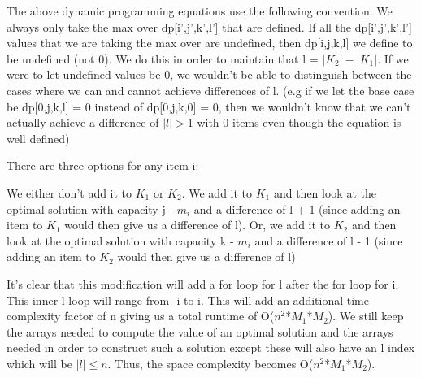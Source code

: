 \documentclass[11pt,a4paper]{article}
\begin{document}
The above dynamic programming equations use the following convention: We always only take the max over dp[i',j',k',l'] that are defined. If all the dp[i',j',k',l'] values that we are taking the max over are undefined, then dp[i,j,k,l] we define to be undefined (not 0). We do this in order to maintain that l = $|K_{2}| - |K_{1}|$. If we were to let undefined values be 0, we wouldn't be able to distinguish between the cases where we can and cannot achieve differences of l. (e.g if we let the base case be dp[0,j,k,l] = 0 instead of dp[0,j,k,0] = 0, then we wouldn't know that we can't actually achieve a difference of $|l| > 1$ with 0 items even though the equation is well defined)

There are three options for any item i:

We either don't add it to $K_{1}$ or $K_{2}$. We add it to $K_{1}$ and then look at the optimal solution with capacity j - $m_{i}$ and a difference of l + 1 (since adding an item to $K_{1}$ would then give us a difference of l). Or, we add it to $K_{2}$ and then look at the optimal solution with capacity k - $m_{i}$ and a difference of l - 1 (since adding an item to $K_{2}$ would then give us a difference of l)

It's clear that this modification will add a for loop for l after the for loop for i. This inner l loop will range from -i to i. This will add an additional time complexity factor of n giving us a total runtime of O($n^{2}$*$M_{1}$*$M_{2}$).  We still keep the arrays needed to compute the value of an optimal solution and the arrays needed in order to construct such a solution except these will also have an l index which will be $|l| \leq n$. Thus, the space complexity becomes O($n^{2}$*$M_{1}$*$M_{2}$).
\end{document}
